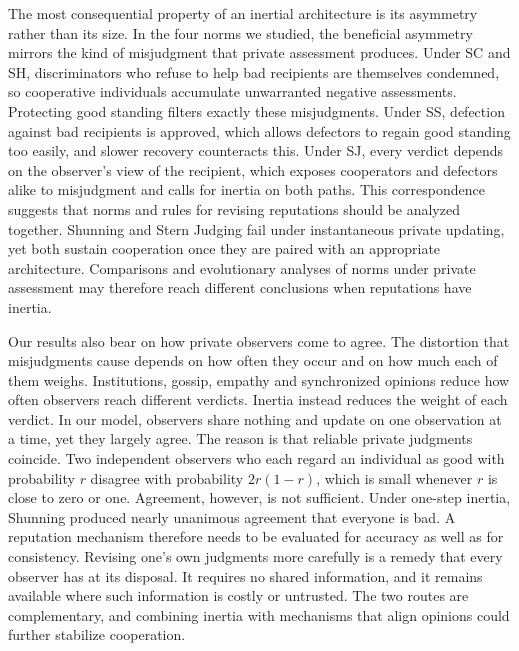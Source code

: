 \documentclass[10pt]{wlscirep}
\theoremstyle{plain}
\theoremstyle{remark}
\begin{document}
The most consequential property of an inertial architecture is its asymmetry rather than its size. In the four norms we studied, the beneficial asymmetry mirrors the kind of misjudgment that private assessment produces. Under SC and SH, discriminators who refuse to help bad recipients are themselves condemned, so cooperative individuals accumulate unwarranted negative assessments. Protecting good standing filters exactly these misjudgments. Under SS, defection against bad recipients is approved, which allows defectors to regain good standing too easily, and slower recovery counteracts this. Under SJ, every verdict depends on the observer's view of the recipient, which exposes cooperators and defectors alike to misjudgment and calls for inertia on both paths. This correspondence suggests that norms and rules for revising reputations should be analyzed together. Shunning and Stern Judging fail under instantaneous private updating, yet both sustain cooperation once they are paired with an appropriate architecture. Comparisons and evolutionary analyses of norms under private assessment\cite{kessinger2023,murase2024computational} may therefore reach different conclusions when reputations have inertia.

Our results also bear on how private observers come to agree. The distortion that misjudgments cause depends on how often they occur and on how much each of them weighs. Institutions, gossip, empathy and synchronized opinions reduce how often observers reach different verdicts\cite{radzvilavicius2021,kawakatsu2024,radzvilavicius2019,murase2024synchronization,tham2026}. Inertia instead reduces the weight of each verdict. In our model, observers share nothing and update on one observation at a time, yet they largely agree. The reason is that reliable private judgments coincide. Two independent observers who each regard an individual as good with probability $r$ disagree with probability $2r(1-r)$, which is small whenever $r$ is close to zero or one. Agreement, however, is not sufficient. Under one-step inertia, Shunning produced nearly unanimous agreement that everyone is bad. A reputation mechanism therefore needs to be evaluated for accuracy as well as for consistency. Revising one's own judgments more carefully is a remedy that every observer has at its disposal. It requires no shared information, and it remains available where such information is costly or untrusted\cite{iyengar2019}. The two routes are complementary, and combining inertia with mechanisms that align opinions could further stabilize cooperation.
\end{document}
